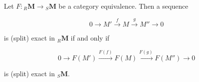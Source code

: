 Let $F: {}_R \mathbf{M} \to {}_S \mathbf{M}$ be a category equivalence. Then a sequence

$$0 \to M' \xrightarrow{f} M \xrightarrow{g} M'' \to 0$$

is (split) exact in ${}_R \mathbf{M}$ if and only if

$$0 \to F(M') \xrightarrow{F(f)} F(M) \xrightarrow{F(g)} F(M'') \to 0$$

is (split) exact in ${}_S \mathbf{M}$.
